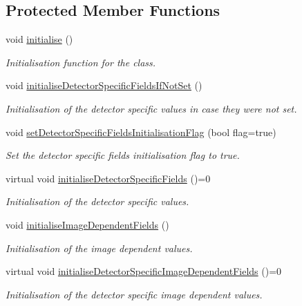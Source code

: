 \subsection*{Protected Member Functions}
\begin{DoxyCompactItemize}
\item 
void \hyperlink{classmultiscale_1_1analysis_1_1Detector_ae9be577bb23f9472d8ca3e19519764f8}{initialise} ()
\begin{DoxyCompactList}\small\item\em Initialisation function for the class. \end{DoxyCompactList}\item 
void \hyperlink{classmultiscale_1_1analysis_1_1Detector_a9636effe77eabf614210dbb079c18bf0}{initialise\-Detector\-Specific\-Fields\-If\-Not\-Set} ()
\begin{DoxyCompactList}\small\item\em Initialisation of the detector specific values in case they were not set. \end{DoxyCompactList}\item 
void \hyperlink{classmultiscale_1_1analysis_1_1Detector_a610c16fdecd543f15575f0effb08ff00}{set\-Detector\-Specific\-Fields\-Initialisation\-Flag} (bool flag=true)
\begin{DoxyCompactList}\small\item\em Set the detector specific fields initialisation flag to true. \end{DoxyCompactList}\item 
virtual void \hyperlink{classmultiscale_1_1analysis_1_1Detector_a83aea2a1b70e54d08cf3b0514c780796}{initialise\-Detector\-Specific\-Fields} ()=0
\begin{DoxyCompactList}\small\item\em Initialisation of the detector specific values. \end{DoxyCompactList}\item 
void \hyperlink{classmultiscale_1_1analysis_1_1Detector_aa99821e2690a7776a598b3a5c1cd3d5d}{initialise\-Image\-Dependent\-Fields} ()
\begin{DoxyCompactList}\small\item\em Initialisation of the image dependent values. \end{DoxyCompactList}\item 
virtual void \hyperlink{classmultiscale_1_1analysis_1_1Detector_ab511a3cbe1766a33cb24f61c6fff7253}{initialise\-Detector\-Specific\-Image\-Dependent\-Fields} ()=0
\begin{DoxyCompactList}\small\item\em Initialisation of the detector specific image dependent values. \end{DoxyCompactList}\item 

\end{DoxyCompactItemize}
